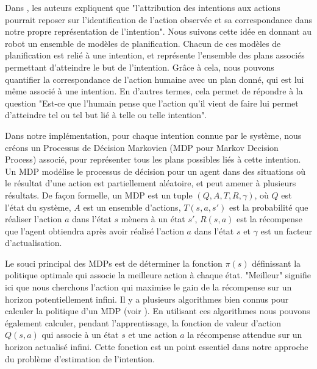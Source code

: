 \documentclass[a4paper,11pt,twoside]{StyleThese}
\begin{document}
Dans \cite{Blakemore2001}, les auteurs expliquent que "l'attribution des intentions aux actions pourrait reposer sur l'identification de l'action observée et sa correspondance dans notre propre représentation de l'intention". Nous suivons cette idée en donnant au robot un ensemble de modèles de planification. Chacun de ces modèles de planification est relié à une intention, et représente l'ensemble des plans associés permettant d'atteindre le but de l'intention. Grâce à cela, nous pouvons quantifier la correspondance de l'action humaine avec un plan donné, qui est lui même associé à une intention. En d'autres termes, cela permet de répondre à la question "Est-ce que l'humain pense que l'action qu'il vient de faire lui permet d'atteindre tel ou tel but lié à telle ou telle intention".

Dans notre implémentation, pour chaque intention connue par le système, nous créons un Processus de Décision Markovien (MDP pour Markov Decision Process) associé, pour représenter tous les plans possibles liés à cette intention. Un MDP modélise le processus de décision pour un agent dans des situations où le résultat d'une action est partiellement aléatoire, et peut amener à plusieurs résultats. De façon formelle, un MDP est un tuple  \((Q,A,T,R,\gamma)\), où $Q$ est l'état du système, $A$ est un ensemble d'actions, $T(s,a,s')$ est la probabilité que réaliser l'action $a$ dans l'état $s$ mènera à un état $s'$, $R(s,a)$ est la récompense que l'agent obtiendra après avoir réalisé l'action $a$ dans l'état $s$ et \(\gamma\) est un facteur d'actualisation.


Le souci principal des MDPs est de déterminer la fonction \(\pi(s)\) définissant la politique optimale qui associe la meilleure action à chaque état. "Meilleur" signifie ici que nous cherchons l'action qui maximise le gain de la récompense sur un horizon potentiellement infini. Il y a plusieurs algorithmes bien connus pour calculer la politique d'un MDP (voir \cite{2012Mausam}). En utilisant ces algorithmes nous pouvons également calculer, pendant l'apprentissage, la fonction de valeur d'action \(Q(s,a)\) qui associe à un état $s$ et une action $a$ la récompense attendue sur un horizon actualisé infini. Cette fonction est un point essentiel dans notre approche du problème d'estimation de l'intention.
\end{document}
